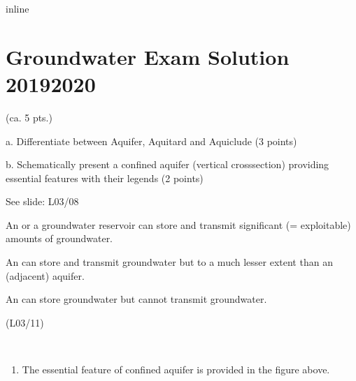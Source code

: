 \documentclass[letterpaper,10pt,english]{sphinxmanual}
\begin{document}
\begin{sphinxVerbatim}[commandchars=\\\{\}]
   
    
   
   
   
   
 inline 
    
\end{sphinxVerbatim}


\section{Groundwater Exam Solution \sphinxhyphen{}  2019\sphinxhyphen{}2020}
\label{\detokenize{contents/questions/GW_exam_2019_20:groundwater-exam-solution-2019-2020}}\label{\detokenize{contents/questions/GW_exam_2019_20::doc}}
   (ca. 5 pts.)

a. Differentiate between Aquifer, Aquitard and Aquiclude (3 points)

b. Schematically present a confined aquifer (vertical cross\sphinxhyphen{}section) providing essential features with their legends (2 points)


See slide: L03/08

An  or a groundwater reservoir can store and transmit significant (= exploitable) amounts of groundwater.

An  can store and transmit groundwater but to a much lesser extent than an (adjacent) aquifer.

An  can store groundwater but cannot transmit groundwater.

 \sphinxhyphen{} (L03/11)

 

\noindent{}

\begin{enumerate}
%
\item {} 
The essential feature of confined aquifer is provided in the figure above.

\end{enumerate}
\end{document}

